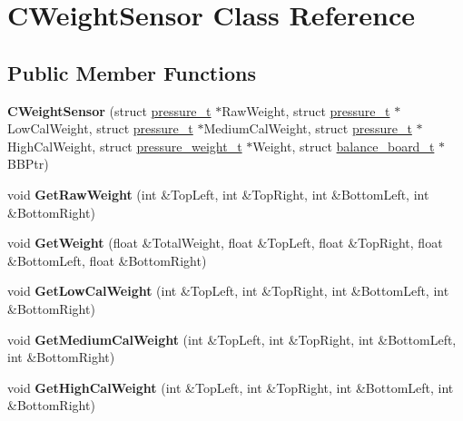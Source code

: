 \hypertarget{class_c_weight_sensor}{\section{C\-Weight\-Sensor Class Reference}
\label{class_c_weight_sensor}
}
\subsection*{Public Member Functions}
\begin{DoxyCompactItemize}
\item 
\hypertarget{class_c_weight_sensor_a04fea64b48194689bf78171e51e97b2d}{{\bfseries C\-Weight\-Sensor} (struct \hyperlink{structpressure__t}{pressure\-\_\-t} $\ast$Raw\-Weight, struct \hyperlink{structpressure__t}{pressure\-\_\-t} $\ast$Low\-Cal\-Weight, struct \hyperlink{structpressure__t}{pressure\-\_\-t} $\ast$Medium\-Cal\-Weight, struct \hyperlink{structpressure__t}{pressure\-\_\-t} $\ast$High\-Cal\-Weight, struct \hyperlink{structpressure__weight__t}{pressure\-\_\-weight\-\_\-t} $\ast$Weight, struct \hyperlink{structbalance__board__t}{balance\-\_\-board\-\_\-t} $\ast$B\-B\-Ptr)}\label{class_c_weight_sensor_a04fea64b48194689bf78171e51e97b2d}

\item 
\hypertarget{class_c_weight_sensor_a3afa84d9e73a9d4d86462661549b3114}{void {\bfseries Get\-Raw\-Weight} (int \&Top\-Left, int \&Top\-Right, int \&Bottom\-Left, int \&Bottom\-Right)}\label{class_c_weight_sensor_a3afa84d9e73a9d4d86462661549b3114}

\item 
\hypertarget{class_c_weight_sensor_a8c7a1bc975f98685aaad423a1e26cffd}{void {\bfseries Get\-Weight} (float \&Total\-Weight, float \&Top\-Left, float \&Top\-Right, float \&Bottom\-Left, float \&Bottom\-Right)}\label{class_c_weight_sensor_a8c7a1bc975f98685aaad423a1e26cffd}

\item 
\hypertarget{class_c_weight_sensor_a6cf2534f75d4f3dd629d49958f0ba7ee}{void {\bfseries Get\-Low\-Cal\-Weight} (int \&Top\-Left, int \&Top\-Right, int \&Bottom\-Left, int \&Bottom\-Right)}\label{class_c_weight_sensor_a6cf2534f75d4f3dd629d49958f0ba7ee}

\item 
\hypertarget{class_c_weight_sensor_a6d3ab9b23321846eb9bcf8401b02ba4e}{void {\bfseries Get\-Medium\-Cal\-Weight} (int \&Top\-Left, int \&Top\-Right, int \&Bottom\-Left, int \&Bottom\-Right)}\label{class_c_weight_sensor_a6d3ab9b23321846eb9bcf8401b02ba4e}

\item 
\hypertarget{class_c_weight_sensor_a554e7bb937f52a77bdc47f5048ef6c0a}{void {\bfseries Get\-High\-Cal\-Weight} (int \&Top\-Left, int \&Top\-Right, int \&Bottom\-Left, int \&Bottom\-Right)}\label{class_c_weight_sensor_a554e7bb937f52a77bdc47f5048ef6c0a}

\end{DoxyCompactItemize}
